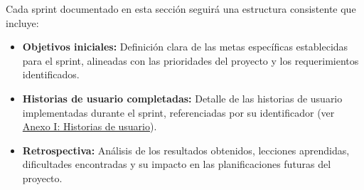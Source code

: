 Cada sprint documentado en esta sección seguirá una estructura consistente que
incluye:

\begin{itemize}
	\item \textbf{Objetivos iniciales:} Definición clara de las metas específicas establecidas para el sprint, alineadas con las prioridades del proyecto y los requerimientos identificados.
	\item \textbf{Historias de usuario completadas:} Detalle de las historias de usuario implementadas durante el sprint, referenciadas por su identificador (ver \hyperref[sec:anexo-historias-usuario]{Anexo I: Historias de usuario}).
	\item \textbf{Retrospectiva:} Análisis de los resultados obtenidos, lecciones aprendidas, dificultades encontradas y su impacto en las planificaciones futuras del proyecto.
\end{itemize}












